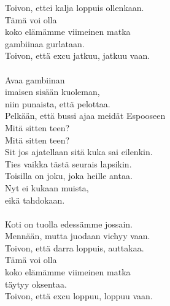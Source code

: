             Toivon, ettei kalja loppuis ollenkaan. \\
            Tämä voi olla \\
            koko elämämme viimeinen matka \\
            gambiinaa gurlataan. \\
            Toivon, että excu jatkuu, jatkuu vaan. \\
\hspace{10mm} \\
            Avaa gambiinan \\
            imaisen sisään kuoleman, \\
            niin punaista, että pelottaa. \\
            Pelkään, että bussi ajaa meidät Espooseen \\
            Mitä sitten teen? \\
            Mitä sitten teen? \\
            Sit jos ajatellaan sitä kuka sai eilenkin. \\
            Ties vaikka tästä seurais lapsikin. \\
            Toisilla on joku, joka heille antaa. \\
            Nyt ei kukaan muista, \\
            eikä tahdokaan. \\
\hspace{10mm} \\
            Koti on tuolla edessämme jossain. \\
            Mennään, mutta juodaan vichyy vaan. \\
            Toivon, että darra loppuis, auttakaa. \\
            Tämä voi olla \\
            koko elämämme viimeinen matka \\
            täytyy oksentaa. \\
            Toivon, että excu loppuu, loppuu vaan. \\
